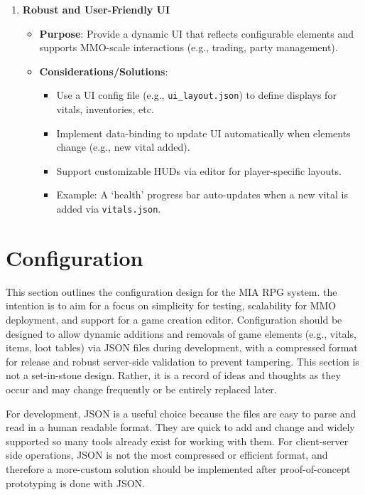 \begin{enumerate}
    \item \textbf{Robust and User-Friendly UI}
        \begin{itemize}
            \item \textbf{Purpose}: Provide a dynamic UI that reflects configurable elements and supports MMO-scale interactions (e.g., trading, party management).
            \item \textbf{Considerations/Solutions}:
                \begin{itemize}
                    \item Use a UI config file (e.g., \texttt{ui\_layout.json}) to define displays for vitals, inventories, etc.
                    \item Implement data-binding to update UI automatically when elements change (e.g., new vital added).
                    \item Support customizable HUDs via editor for player-specific layouts.
                    \item Example: A `health' progress bar auto-updates when a new vital is added via \texttt{vitals.json}.
                \end{itemize}
        \end{itemize}
\end{enumerate}














\section{Configuration}

This section outlines the configuration design for the MIA RPG system. the intention is to aim for a focus on simplicity for testing, scalability for MMO deployment, and support for a game creation editor. Configuration should be designed to allow dynamic additions and removals of game elements (e.g., vitals, items, loot tables) via JSON files during development, with a compressed format for release and robust server-side validation to prevent tampering. This section is not a set-in-stone design. Rather, it is a record of ideas and thoughts as they occur and may change frequently or be entirely replaced later.

For development, JSON is a useful choice because the files are easy to parse and read in a human readable format. They are quick to add and change and widely supported so many tools already exist for working with them. For client-server side operations, JSON is not the most compressed or efficient format, and therefore a more-custom solution should be implemented after proof-of-concept prototyping is done with JSON.

